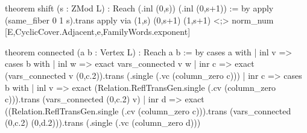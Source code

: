 theorem shift (s : ZMod L) : Reach (.inl (0,s)) (.inl (0,s+1)) := by
  apply (same_fiber 0 1 s).trans
  apply via (1,s) (0,s+1) (1,s+1) <;>
    norm_num [E,CyclicCover.Adjacent,e,FamilyWords.exponent]

theorem connected (a b : Vertex L) : Reach a b := by
  cases a with
  | inl v =>
    cases b with
    | inl w => exact vars_connected v w
    | inr c => exact (vars_connected v (0,c.2)).trans (.single (.vc (column_zero c)))
  | inr c =>
    cases b with
    | inl v => exact (Relation.ReflTransGen.single (.cv (column_zero c))).trans (vars_connected (0,c.2) v)
    | inr d => exact ((Relation.ReflTransGen.single (.cv (column_zero c))).trans
        (vars_connected (0,c.2) (0,d.2))).trans (.single (.vc (column_zero d)))
